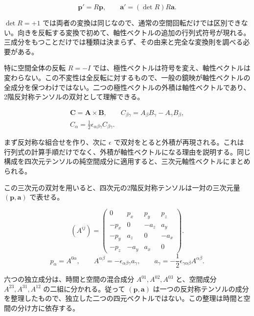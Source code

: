 \documentclass[a4paper,12pt]{article}
\begin{document}
\begin{equation}\label{polar-axial}
\boldsymbol p'=R\boldsymbol p,\qquad\boldsymbol a'=(\det R)R\boldsymbol a.
\end{equation}

$\det R=+1$ では両者の変換は同じなので、通常の空間回転だけでは区別できない。向きを反転する変換で初めて、軸性ベクトルの追加の行列式符号が現れる。三成分をもつことだけでは種類は決まらず、その由来と完全な変換則を調べる必要がある。

特に空間全体の反転 $R=-I$ では、極性ベクトルは符号を変え、軸性ベクトルは変わらない。この不変性は全反転に対するもので、一般の鏡映が軸性ベクトルの全成分を保つわけではない。二つの極性ベクトルの外積は軸性ベクトルであり、2階反対称テンソルの双対として理解できる。

\begin{equation}\label{cross}
\begin{gathered}\boldsymbol C=\boldsymbol A\times\boldsymbol B,\qquad C_{\beta\gamma}=A_\beta B_\gamma-A_\gamma B_\beta,\\C_\alpha=\frac12\epsilon_{\alpha\beta\gamma}C_{\beta\gamma}.\end{gathered}
\end{equation}

まず反対称な組合せを作り、次に $\epsilon$ で双対をとると外積が再現される。これは行列式の計算手順だけでなく、外積が軸性ベクトルになる理由を説明する。同じ構成を四次元テンソルの純空間成分に適用すると、三次元軸性ベクトルにまとめられる。

この三次元の双対を用いると、四次元の2階反対称テンソルは一対の三次元量 $(\boldsymbol p,\boldsymbol a)$ で表せる。

\begin{equation}\label{antisymmetric-matrix}
(A^{ij})=\begin{pmatrix}0&p_x&p_y&p_z\\-p_x&0&-a_z&a_y\\-p_y&a_z&0&-a_x\\-p_z&-a_y&a_x&0\end{pmatrix}.
\end{equation}
\begin{equation}\label{matrix-components}
p_\alpha=A^{0\alpha},\qquad A^{\alpha\beta}=-\epsilon_{\alpha\beta\gamma}a_\gamma,\qquad a_\gamma=-\frac12\epsilon_{\gamma\alpha\beta}A^{\alpha\beta}.
\end{equation}

六つの独立成分は、時間と空間の混合成分 $A^{01},A^{02},A^{03}$ と、空間成分 $A^{23},A^{31},A^{12}$ の二組に分かれる。従って $(\boldsymbol p,\boldsymbol a)$ は一つの反対称テンソルの成分を整理したもので、独立した二つの四元ベクトルではない。この整理は時間と空間の分け方に依存する。
\end{document}
